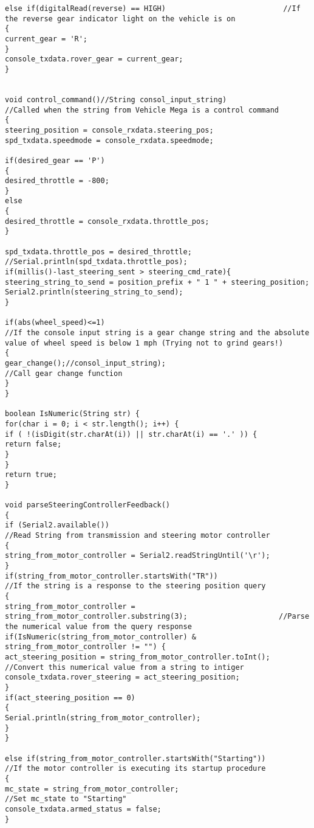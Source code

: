 \begin{lstlisting}[breaklines=true,basicstyle=\tiny]
else if(digitalRead(reverse) == HIGH)                           //If the reverse gear indicator light on the vehicle is on
{
current_gear = 'R';
}
console_txdata.rover_gear = current_gear;
}


void control_command()//String consol_input_string)                                               //Called when the string from Vehicle Mega is a control command
{  
steering_position = console_rxdata.steering_pos;
spd_txdata.speedmode = console_rxdata.speedmode;

if(desired_gear == 'P')
{
desired_throttle = -800;
}
else
{
desired_throttle = console_rxdata.throttle_pos;
}

spd_txdata.throttle_pos = desired_throttle;
//Serial.println(spd_txdata.throttle_pos);
if(millis()-last_steering_sent > steering_cmd_rate){
steering_string_to_send = position_prefix + " 1 " + steering_position;
Serial2.println(steering_string_to_send);
}

if(abs(wheel_speed)<=1)                                                //If the console input string is a gear change string and the absolute value of wheel speed is below 1 mph (Trying not to grind gears!)
{ 
gear_change();//consol_input_string);                                                           //Call gear change function
}
}  

boolean IsNumeric(String str) {
for(char i = 0; i < str.length(); i++) {
if ( !(isDigit(str.charAt(i)) || str.charAt(i) == '.' )) {
return false;
}
}
return true;
}

void parseSteeringControllerFeedback()
{
if (Serial2.available())                                                                      //Read String from transmission and steering motor controller
{
string_from_motor_controller = Serial2.readStringUntil('\r');
}
if(string_from_motor_controller.startsWith("TR"))                                             //If the string is a response to the steering position query
{
string_from_motor_controller = string_from_motor_controller.substring(3);                     //Parse the numerical value from the query response
if(IsNumeric(string_from_motor_controller) & string_from_motor_controller != "") {
act_steering_position = string_from_motor_controller.toInt();                                 //Convert this numerical value from a string to intiger
console_txdata.rover_steering = act_steering_position;
}
if(act_steering_position == 0)
{
Serial.println(string_from_motor_controller); 
}
}

else if(string_from_motor_controller.startsWith("Starting"))                                  //If the motor controller is executing its startup procedure
{
mc_state = string_from_motor_controller;                                                    //Set mc_state to "Starting"
console_txdata.armed_status = false;
}


\end{lstlisting}
